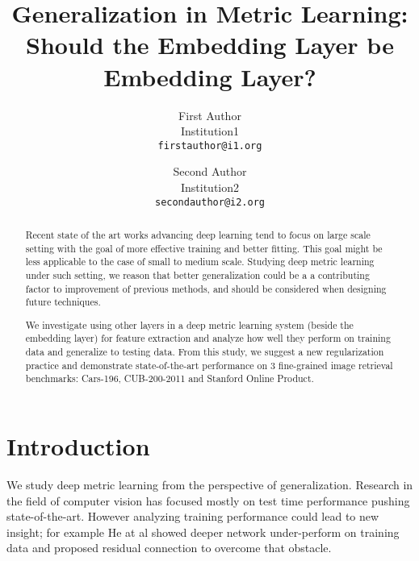 \documentclass[10pt,twocolumn,letterpaper]{article}
\begin{document}
\title{Generalization in Metric Learning: \\ Should the Embedding Layer be Embedding Layer?}

\author{First Author \\
Institution1\\
{\tt\small firstauthor@i1.org}
\and
Second Author \\
Institution2\\
{\tt\small secondauthor@i2.org}
}

\maketitle
\ifwacvfinal\thispagestyle{empty}\fi

\begin{abstract}

Recent state of the art works advancing deep learning tend to focus on large scale setting with the goal of more effective training and better fitting. This goal might be less applicable to the case of small to medium scale.
Studying deep metric learning under such setting, we reason that better generalization could be a a contributing factor to improvement of previous methods, and should be considered when designing future techniques.

We investigate using other layers in a deep metric learning system (beside the embedding layer) for feature extraction and analyze how well they perform on training data and generalize to testing data. 
From this study, we suggest a new regularization practice and demonstrate state-of-the-art performance on 3 fine-grained image retrieval benchmarks: Cars-196, CUB-200-2011 and Stanford Online Product.

\end{abstract}

\section{Introduction}

We study deep metric learning from the perspective of generalization.
Research in the field of computer vision has focused mostly on test time performance pushing state-of-the-art. However analyzing training performance could lead to new insight; for example He at al \cite{he2016deep} showed deeper network under-perform on training data and proposed residual connection to overcome that obstacle.
\end{document}
